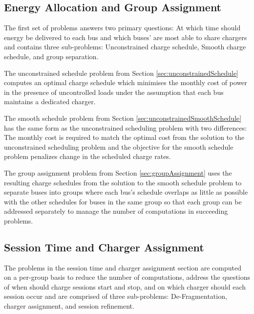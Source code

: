 \subsection{Energy Allocation and Group Assignment} 
\par The first set of problems answers two primary questions: At which time should energy be delivered to each bus and which buses' are most able to share chargers and contains three sub-problems: Unconstrained charge schedule, Smooth charge schedule, and group separation.  
\par The unconstrained schedule problem from Section \ref{sec:unconstrainedSchedule} computes an optimal charge schedule which minimises the monthly cost of power in the presence of uncontrolled loads under the assumption that each bus maintains a dedicated charger.  
\par The smooth schedule problem from Section \ref{sec:unconstrainedSmoothSchedule} has the same form as the unconstrained scheduling problem with two differences: The monthly cost is required to match the optimal cost from the solution to the unconstrained scheduling problem and the objective for the smooth schedule problem penalizes change in the scheduled charge rates.  
\par The group assignment problem from Section \ref{sec:groupAssignment} uses the resulting charge schedules from the solution to the smooth schedule problem to separate buses into groups where each bus's schedule overlaps as little as possible with the other schedules for buses in the same group so that each group can be addressed separately to manage the number of computations in succeeding problems.  

\subsection{Session Time and Charger Assignment} 
The problems in the session time and charger assignment section are computed on a per-group basis to reduce the number of computations, address the questions of when should charge sessions start and stop, and on which charger should each session occur and are comprised of three sub-problems: De-Fragmentation, charger assignment, and session refinement.

